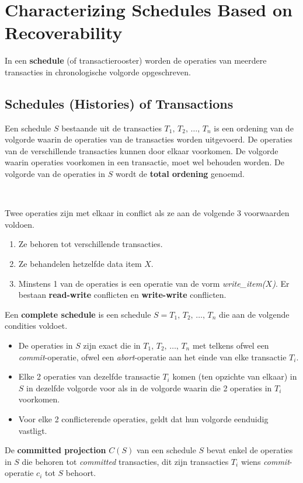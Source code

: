 \section{Characterizing Schedules Based on Recoverability}
In een \textbf{schedule} (of transactierooster) worden de operaties van meerdere transacties in chronologische volgorde opgeschreven.


\subsection{Schedules (Histories) of Transactions}
Een schedule $S$ bestaande uit de transacties $T_1,\, T_2,\, \dots,\, T_n$ is een ordening van de volgorde waarin de operaties van de transacties worden uitgevoerd. De operaties van de verschillende transacties kunnen door elkaar voorkomen. De volgorde waarin operaties voorkomen in een transactie, moet wel behouden worden. De volgorde van de operaties in $S$ wordt de \textbf{total ordening} genoemd.

~

\noindent Twee operaties zijn met elkaar in conflict als ze aan de volgende 3 voorwaarden voldoen.
\vspace{-1mm}
\begin{enumerate}\addtolength{\itemsep}{-0.2\baselineskip}
	\item Ze behoren tot verschillende transacties.
	\item Ze behandelen hetzelfde data item $X$.
	\item Minstens 1 van de operaties is een operatie van de vorm \textit{write\_item($X$)}. Er bestaan \textbf{read-write} conflicten en \textbf{write-write} conflicten.
\end{enumerate}
Een \textbf{complete schedule} is een schedule $S = T_1,\, T_2,\, \dots,\, T_n$ die aan de volgende condities voldoet.
\begin{itemize}\addtolength{\itemsep}{-0.2\baselineskip}
	\item De operaties in $S$ zijn exact die in $T_1,\, T_2,\, \dots,\, T_n$ met telkens ofwel een \textit{commit}-operatie, ofwel een \textit{abort}-operatie aan het einde van elke transactie $T_i$.
	\item Elke 2 operaties van dezelfde transactie $T_i$ komen (ten opzichte van elkaar) in $S$ in dezelfde volgorde voor als in de volgorde waarin die 2 operaties in $T_i$ voorkomen.
	\item Voor elke 2 conflicterende operaties, geldt dat hun volgorde eenduidig vastligt.
\end{itemize}
De \textbf{committed projection} $C(S)$ van een schedule $S$ bevat enkel de operaties in $S$ die behoren tot \textit{committed} transacties, dit zijn transacties $T_i$ wiens \textit{commit}-operatie $c_i$ tot $S$ behoort.


